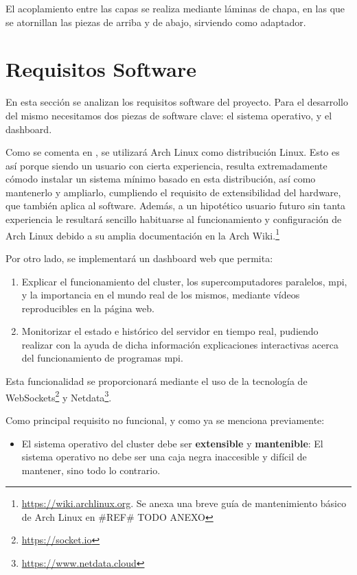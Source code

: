 El acoplamiento entre las capas se realiza mediante láminas de chapa, en las que se atornillan las piezas de arriba y de abajo, sirviendo como adaptador.


\section{Requisitos Software}
\label{sec:requisitos_software}
En esta sección se analizan los requisitos software del proyecto. Para el desarrollo del mismo necesitamos dos piezas de software clave: el sistema operativo, y el dashboard.

Como se comenta en , se utilizará Arch Linux como distribución Linux. Esto es así porque siendo un usuario con cierta experiencia, resulta extremadamente cómodo instalar un sistema mínimo basado en esta distribución, así como mantenerlo y ampliarlo, cumpliendo el requisito de extensibilidad del hardware, que también aplica al software. Además, a un hipotético usuario futuro sin tanta experiencia le resultará sencillo habituarse al funcionamiento y configuración de Arch Linux debido a su amplia documentación en la Arch Wiki.\footnote{\url{https://wiki.archlinux.org}. Se anexa una breve guía de mantenimiento básico de Arch Linux en \#REF\# TODO ANEXO}

Por otro lado, se implementará un dashboard web que permita:
\begin{enumerate}
    \item Explicar el funcionamiento del cluster, los supercomputadores paralelos, \acrshort{mpi}, y la importancia en el mundo real de los mismos, mediante vídeos reproducibles en la página web.
    \item Monitorizar el estado e histórico del servidor en tiempo real, pudiendo realizar con la ayuda de dicha información explicaciones interactivas acerca del funcionamiento de programas \acrshort{mpi}.
\end{enumerate}

Esta funcionalidad se proporcionará mediante el uso de la tecnología de WebSockets\footnote{\url{https://socket.io}} y Netdata\footnote{\url{https://www.netdata.cloud}}.

Como principal requisito no funcional, y como ya se menciona previamente:
\begin{itemize}
    \item El sistema operativo del cluster debe ser \textbf{extensible} y \textbf{mantenible}: El sistema operativo no debe ser una caja negra inaccesible y difícil de mantener, sino todo lo contrario.
\end{itemize}
